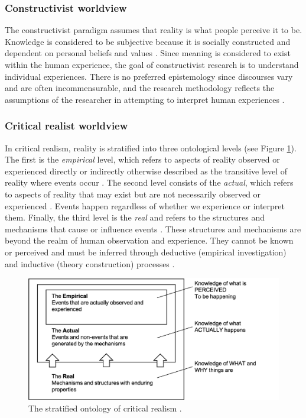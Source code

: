 \subsubsection{Constructivist worldview}

The constructivist paradigm assumes that reality is what people perceive it to be. Knowledge is considered to be subjective because it is socially constructed and dependent on personal beliefs and values \citep{chilisa2012selecting}. Since meaning is considered to exist within the human experience, the goal of constructivist research is to understand individual experiences. There is no preferred epistemology since discourses vary and are often incommensurable, and the research methodology reflects the assumptions of the researcher in attempting to interpret human experiences \citep{van2007engaged}. 

\subsubsection{Critical realist worldview}

In critical realism, reality is stratified into three ontological levels (see Figure \ref{fig:stratified_reality}). The first is the \textit{empirical} level, which refers to aspects of reality observed or experienced directly or indirectly otherwise described as the transitive level of reality where events occur \citep{fletcher2017applying}. The second level consists of the \textit{actual}, which refers to aspects of reality that may exist but are not necessarily observed or experienced \citep{mcevoy2006critical}. Events happen regardless of whether we experience or interpret them. Finally, the third level is the \textit{real} and refers to the structures and mechanisms that cause or influence events \citep{zachariadis2013methodological}. These structures and mechanisms are beyond the realm of human observation and experience. They cannot be known or perceived and must be inferred through deductive (empirical investigation) and inductive (theory construction) processes \citep{mcevoy2006critical,wynn2012principles}. \medskip

\begin{figure}
\centering
\includegraphics[width=0.9\linewidth]{Images/stratified_reality.png}
\caption[The stratified ontology of critical realism]{The stratified ontology of critical realism \citep{bhaskar2013realist,mingers2006realising}.}
\label{fig:stratified_reality}
\end{figure}

